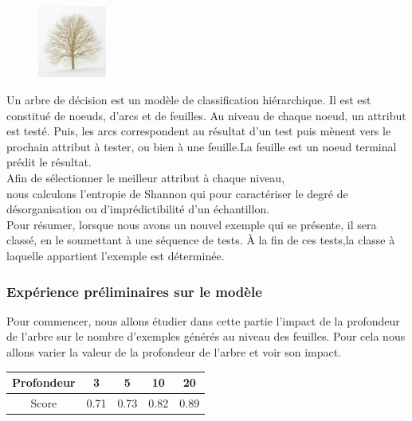\documentclass{article}
\begin{document}
\begin{figure}
  \vspace{-20pt}
  \begin{center}
    \includegraphics[width=0.2\textwidth]{tree.png}
  \end{center}
  \vspace{-20pt}
  \vspace{-10pt}
\end{figure}
\quad Un arbre de décision est un modèle de classification hiérarchique. Il est est constitué de noeuds, d'arcs et de feuilles. Au niveau de chaque noeud, un attribut est testé. Puis, les arcs correspondent au résultat d'un test puis mènent vers le prochain attribut à tester, ou bien à une feuille.La feuille est un noeud terminal prédit le résultat. \\Afin de sélectionner le meilleur attribut à chaque niveau,\\ nous calculons l'entropie de Shannon qui pour caractériser le degré de désorganisation ou d'imprédictibilité d’un échantillon. \\
Pour résumer, lorsque nous avons un nouvel exemple qui se présente, il sera classé, en le soumettant à une séquence de tests. À la fin de ces tests,la classe à laquelle appartient l'exemple est déterminée. 

\subsubsection{Expérience préliminaires sur le modèle}
\quad Pour commencer, nous allons étudier dans cette partie l'impact de la profondeur de l'arbre sur le nombre  d'exemples générés au niveau des feuilles. Pour cela nous allons varier la valeur de la profondeur de l'arbre et voir son impact.
\linebreak
\linebreak
\begin {center}
\begin{tabular}{|c|c|c|c|c|}
  \hline \rowcolor{lightgray}
  Profondeur & 3 & 5 & 10 & 20 \\
  \hline
  Score & 0.71 & 0.73 & 0.82 & 0.89 \\
  \hline
\end{tabular}
\end {center}
\end{document}

